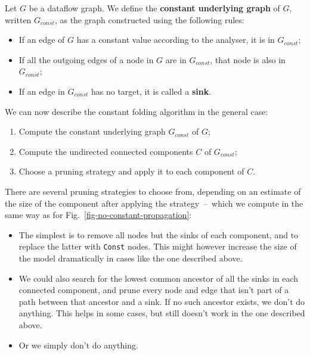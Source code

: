 \documentclass[11pt]{article}
\begin{document}
\begin{definition}
Let $G$ be a dataflow graph. We define the \textbf{constant underlying graph} of $G$, written $G_{const}$, as the graph constructed using the following rules:%
\begin{itemize}[noitemsep]
    \item If an edge of $G$ has a constant value according to the analyser, it is in $G_{const}$;
    \item If all the outgoing edges of a node in $G$ are in $G_{const}$, that node is also in $G_{const}$;
    \item If an edge in $G_{const}$ has no target, it is called a \textbf{sink}.\\
\end{itemize}
\end{definition}

\noindent
We can now describe the constant folding algorithm in the general case:
\begin{enumerate}[noitemsep]
    \item Compute the constant underlying graph $G_{const}$ of $G$;
    \item Compute the undirected connected components $C$ of $G_{const}$;
    \item Choose a pruning strategy and apply it to each component of $C$.\\
\end{enumerate}

\noindent
There are several pruning strategies to choose from, depending on an estimate of the size of the component after applying the strategy~--~which we compute in the same way as for Fig.~\ref{fig-no-constant-propagation}:
\begin{itemize}
    \item The simplest is to remove all nodes but the sinks of each component, and to replace the latter with \texttt{Const} nodes. This might however increase the size of the model dramatically in cases like the one described above.
    \item We could also search for the lowest common ancestor of all the sinks in each connected component, and prune every node and edge that isn't part of a path between that ancestor and a sink. If no such ancestor exists, we don't do anything. This helps in some cases, but still doesn't work in the one described above.
    \item Or we simply don't do anything.
\end{itemize}
\end{document}
